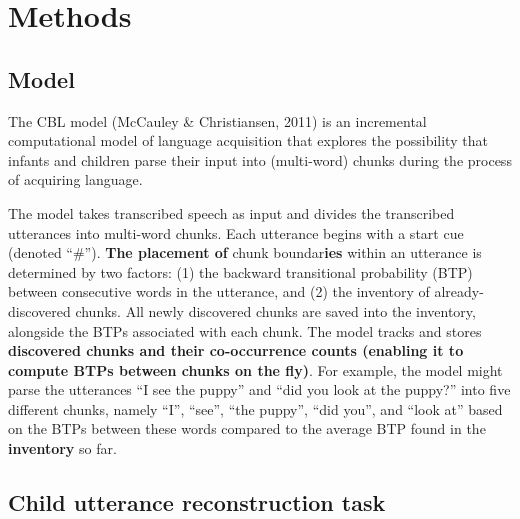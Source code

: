 \documentclass[
  english,
  man,mask,floatsintext]{apa6}
\begin{document}
\hypertarget{methods}{%
\section{Methods}\label{methods}}

\hypertarget{model}{%
\subsection{Model}\label{model}}

The CBL model (McCauley \& Christiansen, 2011) is an incremental computational model of language acquisition that explores the possibility that infants and children parse their input into (multi-word) chunks during the process of acquiring language.

The model takes transcribed speech as input and divides the transcribed utterances into multi-word chunks. Each utterance begins with a start cue (denoted \enquote{\#}). \textbf{The placement of} chunk boundar\textbf{ies} within an utterance is determined by two factors: (1) the backward transitional probability (BTP) between consecutive words in the utterance, and (2) the inventory of already-discovered chunks. All newly discovered chunks are saved into the inventory, alongside the BTPs associated with each chunk. The model tracks and stores \textbf{discovered chunks and their co-occurrence counts (enabling it to compute BTPs between chunks on the fly)}. For example, the model might parse the utterances \enquote{I see the puppy} and \enquote{did you look at the puppy?} into five different chunks, namely \enquote{I}, \enquote{see}, \enquote{the puppy}, \enquote{did you}, and \enquote{look at} based on the BTPs between these words compared to the average BTP found in the \textbf{inventory} so far.

\hypertarget{child-utterance-reconstruction-task}{%
\subsection{Child utterance reconstruction task}\label{child-utterance-reconstruction-task}}
\end{document}

